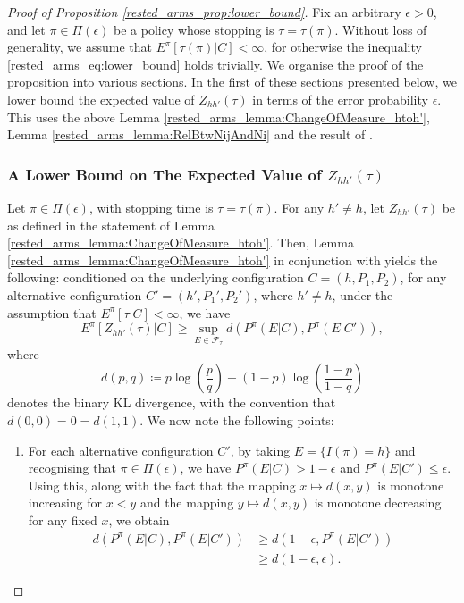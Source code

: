 \begin{proof}[Proof of Proposition \ref{rested_arms_prop:lower_bound}]
Fix an arbitrary $\epsilon>0$, and let $\pi\in\Pi(\epsilon)$ be a policy whose stopping is $\tau=\tau(\pi)$. Without loss of generality, we assume that $E^\pi[\tau(\pi)|C] < \infty$, for otherwise the inequality \eqref{rested_arms_eq:lower_bound} holds trivially. We organise the proof of the proposition into various sections. In the first of these sections presented below, we lower bound the expected value of $Z_{hh'}(\tau)$ in terms of the error probability $\epsilon$. This uses the above Lemma \ref{rested_arms_lemma:ChangeOfMeasure_htoh'}, Lemma \ref{rested_arms_lemma:RelBtwNijAndNi} and the result of \cite[Lemma 19]{kaufmann2016complexity}.

\subsubsection{A Lower Bound on The Expected Value of $Z_{hh'}(\tau)$}
Let $\pi\in\Pi(\epsilon)$, with stopping time is $\tau=\tau(\pi)$. For any $h'\neq h$, let $Z_{hh'}(\tau)$ be as defined in the statement of Lemma \ref{rested_arms_lemma:ChangeOfMeasure_htoh'}. Then, Lemma \ref{rested_arms_lemma:ChangeOfMeasure_htoh'} in conjunction with \cite[Lemma 19]{kaufmann2016complexity} yields the following: conditioned on the underlying configuration $C=(h,P_1,P_2)$, for any alternative configuration $C'=(h',P_1',P_2')$, where $h'\neq h$, under the assumption that $E^\pi[\tau|C]<\infty$, we have
\begin{equation}
E^\pi[Z_{hh'}(\tau)|C]\geq \sup\limits_{E\in \mathcal{F}_{\tau}}d(P^\pi(E|C),P^\pi(E|C')),\label{rested_arms_eq:analog_of_lemma_19_Kaufmann}
\end{equation}
 where \[d(p,q)\coloneqq p\log\left(\frac{p}{q}\right)+(1-p)\log\left(\frac{1-p}{1-q}\right)\]
denotes the binary KL divergence, with the convention that $d(0,0)=0=d(1,1)$. We now note the following points:
\begin{enumerate}
    \item For each alternative configuration $C'$, by taking $E=\{I(\pi)=h\}$ and recognising that $\pi\in\Pi(\epsilon)$, we have $P^\pi(E|C)>1-\epsilon$ and $P^\pi(E|C')\leq \epsilon$. Using this, along with the fact that the mapping $x\mapsto d(x,y)$ is monotone increasing for $x<y$ and the mapping $y\mapsto d(x,y)$ is monotone decreasing for any fixed $x$, we obtain
	\begingroup\allowdisplaybreaks\begin{align}
		d(P^\pi(E|C),P^\pi(E|C'))&\geq d(1-\epsilon,P^\pi(E|C'))\nonumber\\
		&\geq d(1-\epsilon,\epsilon).
	\end{align}\endgroup
	

\end{enumerate}
\end{proof}
